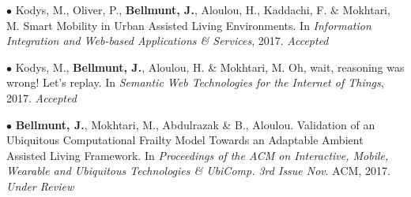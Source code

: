 \documentclass[paper=a4,fontsize=11pt]{temp} %
\begin{document}

\hspace{3mm}
\begin{minipage}{0.04\linewidth}
        \hspace{\linewidth}
		\end{minipage}%
   \begin{minipage}{0.88\linewidth}

\begin{footnotesize}

$\bullet$ Kodys, M., Oliver, P., \textbf{\textcolor{blueCV}{Bellmunt, J.}}, Aloulou, H., Kaddachi, F. \& Mokhtari, M. Smart Mobility in Urban Assisted Living Environments. In \textit{Information Integration and Web-based Applications \& Services}, 2017. \textit{Accepted}

$\bullet$ Kodys, M., \textbf{\textcolor{blueCV}{Bellmunt, J.}}, Aloulou, H. \& Mokhtari, M. Oh, wait, reasoning was wrong! Let's replay. In \textit{Semantic Web Technologies for the Internet of Things}, 2017. \textit{Accepted}

$\bullet$ \textbf{\textcolor{blueCV}{Bellmunt, J.}}, Mokhtari, M., Abdulrazak \& B., Aloulou. Validation of an Ubiquitous Computational Frailty Model Towards an Adaptable Ambient Assisted Living Framework. In \textit{Proceedings of the ACM on Interactive, Mobile, Wearable and Ubiquitous Technologies \& UbiComp. 3rd Issue Nov}. ACM, 2017. \textit{Under Review}


\end{footnotesize}
\end{minipage}
\end{document}
